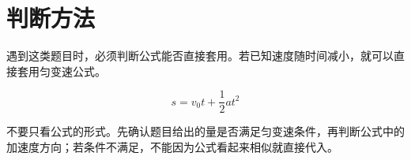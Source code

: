 \section{判断方法}

遇到这类题目时，必须判断公式能否直接套用。若已知速度随时间减小，就可以直接套用匀变速公式。

\begin{equation}
  s=v_0t+\frac{1}{2}at^2
\end{equation}

不要只看公式的形式。先确认题目给出的量是否满足匀变速条件，再判断公式中的加速度方向；若条件不满足，不能因为公式看起来相似就直接代入。
